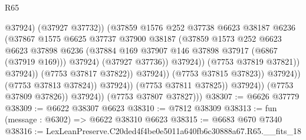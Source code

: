 \begin{lexlean}{R65}
\begin{coremodule}
{                                                  @37924)
                                                (@37927 @37732))
                                              (@37859
                                                @1576
                                                @252
                                                @37738
                                                @6623
                                                @38187
                                                @6236
                                                (@37867
                                                  @1575
                                                  @6625
                                                  @37737
                                                  @37900
                                                  @38187
                                                  (@37859
                                                    @1573
                                                    @252
                                                    @6623
                                                    @6623
                                                    @37898
                                                    @6236
                                                    (@37884
                                                      @169
                                                      @37907
                                                      @146
                                                      @37898
                                                      @37917
                                                      (@6867 (@37919 @169)))
                                                    @37924)
                                                  (@37927 @37736))
                                                @37924))
                                            (@7753 @37819 @37821))
                                          @37924))
                                      (@7753 @37817 @37822))
                                    @37924))
                                (@7753 @37815 @37823))
                              @37924))
                          (@7753 @37813 @37824))
                        @37924))
                    (@7753 @37811 @37825))
                  @37924))
              (@7753 @37809 @37826))
            @37924))
        (@7753 @37807 @37827)))
@38307 := @6626 @37779
@38309 := @6622 @38307 @6623
@38310 := @7812 @38309
@38313 := fun (message : @6302) => @6622 @38310 @6623
@38315 := @6683 @670 @7340
@38316 := LexLeanPreserve.C20ded4f4be0e5011a640fb6c30888a67.R65.__fits_18
}
\end{coremodule}
\end{lexlean}
